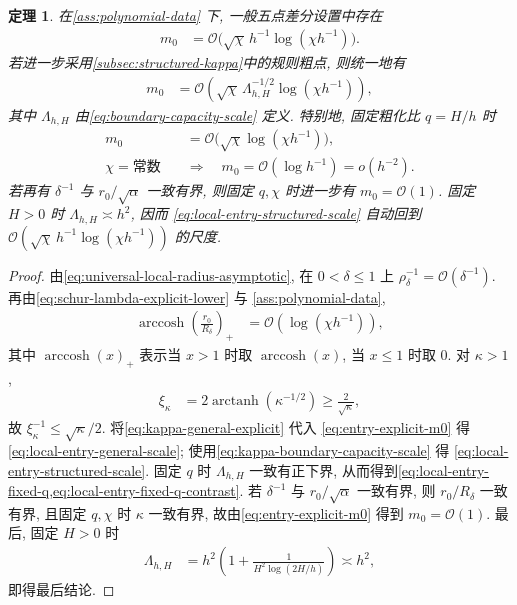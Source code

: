 \documentclass{ctexart}
\newcommand{\q}{\quad}
\renewcommand{\O}{\mathcal{O}}
\newcommand{\dt}{\delta}
\renewcommand{\ge}{\geqslant}
\renewcommand{\le}{\leqslant}
\DeclareMathOperator{\arccosh}{arccosh}
\newtheorem{theorem}{定理}[section]
\begin{document}
\begin{theorem}
\label{thm:asymptotic-local-entry}
在\cref{ass:polynomial-data} 下, 一般五点差分设置中存在
\begin{align}
    m_0
    &=\O\bigl(\sqrt\chi\,h^{-1}\log(\chi h^{-1})\bigr).
    \label{eq:local-entry-general-scale}
\end{align}
若进一步采用\cref{subsec:structured-kappa}中的规则粗点, 则统一地有
\begin{align}
    m_0
    &=\O\left(
      \sqrt\chi\,
      \Lambda_{h,H}^{-1/2}
      \log(\chi h^{-1})
    \right),
    \label{eq:local-entry-structured-scale}
\end{align}
其中 $\Lambda_{h,H}$ 由\cref{eq:boundary-capacity-scale} 定义.
特别地, 固定粗化比 $q=H/h$ 时
\begin{align}
    m_0
    &=\O\bigl(\sqrt\chi\log(\chi h^{-1})\bigr),
    \label{eq:local-entry-fixed-q}\\
    \chi=\text{常数}
    \q&\Longrightarrow\q
    m_0=\O(\log h^{-1})=o(h^{-2}).
    \label{eq:local-entry-fixed-q-contrast}
\end{align}
若再有 $\dt^{-1}$ 与 $r_0/\sqrt\alpha$ 一致有界,
则固定 $q,\chi$ 时进一步有 $m_0=\O(1)$.
固定 $H>0$ 时
$\Lambda_{h,H}\asymp h^2$, 因而
\cref{eq:local-entry-structured-scale} 自动回到
$\O(\sqrt\chi\,h^{-1}\log(\chi h^{-1}))$ 的尺度.
\end{theorem}

\begin{proof}
由\cref{eq:universal-local-radius-asymptotic},
在 $0<\dt\le1$ 上
$\rho_\dt^{-1}=\O(\dt^{-1})$.
再由\cref{eq:schur-lambda-explicit-lower} 与
\cref{ass:polynomial-data},
\begin{align}
    \arccosh\left(\frac{r_0}{R_\dt}\right)_+
    &=\O(\log(\chi h^{-1})),
    \label{eq:entry-arcosh-scaling}
\end{align}
其中 $\arccosh(x)_+$ 表示当 $x>1$ 时取
$\arccosh(x)$, 当 $x\le1$ 时取 $0$.
对 $\kappa>1$,
\begin{align}
    \xi_\kappa
    &=
    2\operatorname{arctanh}(\kappa^{-1/2})
    \ge\frac2{\sqrt\kappa},
    \label{eq:xi-kappa-lower}
\end{align}
故 $\xi_\kappa^{-1}\le\sqrt\kappa/2$.
将\cref{eq:kappa-general-explicit} 代入
\cref{eq:entry-explicit-m0} 得
\cref{eq:local-entry-general-scale};
使用\cref{eq:kappa-boundary-capacity-scale} 得
\cref{eq:local-entry-structured-scale}.
固定 $q$ 时 $\Lambda_{h,H}$ 一致有正下界,
从而得到\cref{eq:local-entry-fixed-q,eq:local-entry-fixed-q-contrast}.
若 $\dt^{-1}$ 与 $r_0/\sqrt\alpha$ 一致有界,
则 $r_0/R_\dt$ 一致有界, 且固定 $q,\chi$ 时
$\kappa$ 一致有界, 故由\cref{eq:entry-explicit-m0}
得到 $m_0=\O(1)$.
最后, 固定 $H>0$ 时
\begin{align}
    \Lambda_{h,H}
    &=
    h^2\left(
      1+\frac1{H^2\log(2H/h)}
    \right)
    \asymp h^2,
    \label{eq:capacity-fixed-H}
\end{align}
即得最后结论.
\end{proof}
\end{document}
